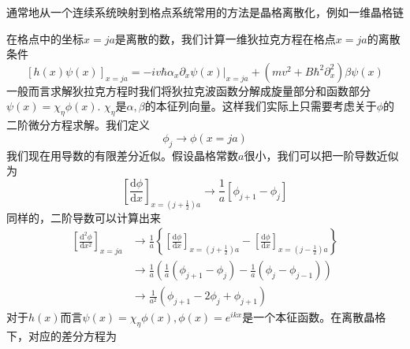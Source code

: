 \documentclass{article}
\numberwithin{equation}{subsection}
\begin{document}
通常地从一个连续系统映射到格点系统常用的方法是晶格离散化，例如一维晶格链
\begin{center}
\end{center}
在格点中的坐标$x=ja$是离散的数，我们计算一维狄拉克方程在格点$x=ja$的离散条件
\begin{equation}
    \left[h(x)\psi(x)\right]_{x=ja}=\left.-iv\hbar\alpha_x\partial_x\psi(x)\right|_{x=ja}+(mv^2+B\hbar^2\partial_x^2)\beta\psi(x)
\end{equation}
一般而言求解狄拉克方程时我们将狄拉克波函数分解成旋量部分和函数部分$\psi(x)=\chi_\eta\phi(x)$. $\chi_\eta$是$\alpha,\beta$的本征列向量。这样我们实际上只需要考虑关于$\phi$的二阶微分方程求解。我们定义
\begin{equation}
    \phi_j\rightarrow\phi(x=ja)
\end{equation}
我们现在用导数的有限差分近似。假设晶格常数$a$很小，我们可以把一阶导数近似为
\begin{equation}
    \left[\frac{\mathrm{d}\phi}{\mathrm{d}x}\right]_{x=(j+\frac{1}{2})a}\rightarrow\frac{1}{a}[\phi_{j+1}-\phi_{j}]
\end{equation}
同样的，二阶导数可以计算出来
\begin{equation}
    \begin{split}
        \left[\frac{\mathrm{d}^2\phi}{\mathrm{d}x^2}\right]_{x=ja}&\rightarrow\frac{1}{a}\left\{\left[\frac{\mathrm{d}\phi}{\mathrm{d}x}\right]_{x=(j+\frac{1}{2})a}-\left[\frac{\mathrm{d}\phi}{\mathrm{d}x}\right]_{x=(j-\frac{1}{2})a}\right\}\\
        &\rightarrow\frac{1}{a}\left(\frac{1}{a}\left(\phi_{j+1}-\phi_{j}\right)-\frac{1}{a}(\phi_j-\phi_{j-1})\right)\\
        &\rightarrow\frac{1}{a^2}(\phi_{j+1}-2\phi_{j}+\phi_{j+1})
    \end{split}
\end{equation}
对于$h(x)$而言$\psi(x)=\chi_\eta\phi(x),\phi(x)=e^{ikx}$是一个本征函数。在离散晶格下，对应的差分方程为
\end{document}
